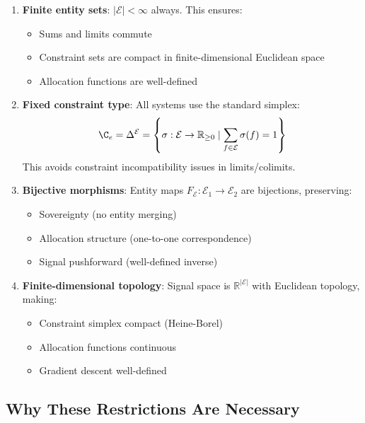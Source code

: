 \documentclass[11pt,a4paper]{article}
\theoremstyle{definition}
\theoremstyle{remark}
\newcommand{\E}{\mathcal{E}}
\begin{document}
\begin{enumerate}
\item \textbf{Finite entity sets}: $|\E| < \infty$ always. This ensures:
   \begin{itemize}
   \item Sums and limits commute
   \item Constraint sets are compact in finite-dimensional Euclidean space
   \item Allocation functions are well-defined
   \end{itemize}

\item \textbf{Fixed constraint type}: All systems use the standard simplex:
   \[ \C_e = \Delta^{\E} = \left\{\sigma: \E \to \mathbb{R}_{\ge 0} \mid \sum_{f \in \E} \sigma(f) = 1\right\} \]
   This avoids constraint incompatibility issues in limits/colimits.

\item \textbf{Bijective morphisms}: Entity maps $F_\E: \E_1 \to \E_2$ are bijections, preserving:
   \begin{itemize}
   \item Sovereignty (no entity merging)
   \item Allocation structure (one-to-one correspondence)
   \item Signal pushforward (well-defined inverse)
   \end{itemize}

\item \textbf{Finite-dimensional topology}: Signal space is $\mathbb{R}^{|\E|}$ with Euclidean topology, making:
   \begin{itemize}
   \item Constraint simplex compact (Heine-Borel)
   \item Allocation functions continuous
   \item Gradient descent well-defined
   \end{itemize}
\end{enumerate}

\subsection{Why These Restrictions Are Necessary}
\end{document}

